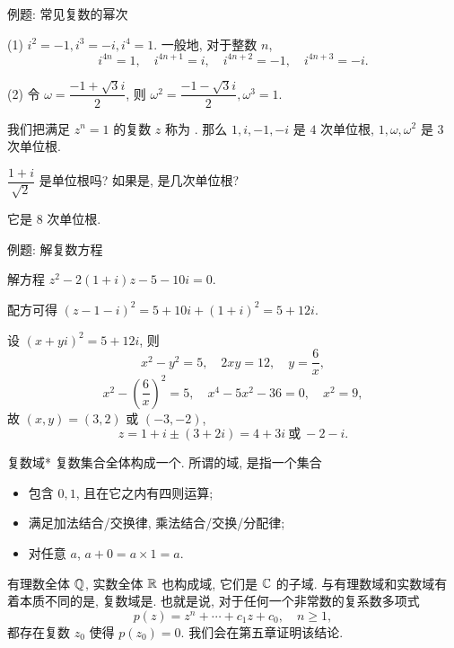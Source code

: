 \begin{frame}{例题: 常见复数的幂次}
\beqskip{5pt}
\begin{example}
(1) $i^2=-1,i^3=-i,i^4=1$.
\onslide<+->
一般地, 对于整数 $n$, 
\[i^{4n}=1,\quad i^{4n+1}=i,\quad i^{4n+2}=-1,\quad i^{4n+3}=-i.\]

\onslide<+->
(2) 令 $\omega=\dfrac{-1+\sqrt 3i}2$, 则 $\omega^2=\dfrac{-1-\sqrt3i}2,\omega^3=1$.
\end{example}
\onslide<+->
我们把满足 $z^n=1$ 的复数 $z$ 称为 .
\onslide<+->
那么 $1,i,-1,-i$ 是 $4$ 次单位根, $1,\omega,\omega^2$ 是 $3$ 次单位根.
\begin{think}
$\dfrac{1+i}{\sqrt2}$ 是单位根吗? 如果是, 是几次单位根?
\end{think}
\vspace{-3pt}
\begin{answer}
它是 $8$ 次单位根.
\end{answer}
\endgroup
\end{frame}


\begin{frame}{例题: 解复数方程}
\beqskip{5pt}
\begin{example}
解方程 $z^2-2(1+i)z-5-10i=0$.
\end{example}
\begin{solution}
配方可得 $(z-1-i)^2=5+10i+(1+i)^2=5+12i$.

\onslide<+->
设 $(x+yi)^2=5+12i$, 则
\[x^2-y^2=5,\quad 2xy=12,\quad y=\dfrac 6x,\]
\onslide<+->
\vspace{-5pt}
\[x^2-\left(\frac 6x\right)^2=5,\quad
x^4-5x^2-36=0,\quad x^2=9,\]
\onslide<+->
故 $(x,y)=(3,2)$ 或 $(-3,-2)$,
\onslide<+->
\[z=1+i\pm(3+2i)=4+3i\ \text{或}\ -2-i.\]
\end{solution}
\endgroup
\end{frame}


\begin{frame}{复数域*}
\onslide<+->
复数集合全体构成一个.
\onslide<+->
所谓的域, 是指一个集合
\begin{itemize}
\item 包含 $0,1$, 且在它之内有四则运算;
\item 满足加法结合/交换律, 乘法结合/交换/分配律;
\item 对任意 $a$, $a+0=a\times 1=a$.
\end{itemize}

\onslide<+->
有理数全体 ${\mathbb{Q}}$, 实数全体 ${\mathbb{R}}$ 也构成域, 它们是 ${\mathbb{C}}$ 的子域.
\onslide<+->
与有理数域和实数域有着本质不同的是, 复数域是.
\onslide<+->
也就是说, 对于任何一个非常数的复系数多项式
\[p(z)=z^n+\cdots+c_1z+c_0,\quad n\ge 1,\]
\onslide<+->
都存在复数 $z_0$ 使得 $p(z_0)=0$.
\onslide<+->
我们会在第五章证明该结论.
\end{frame}


